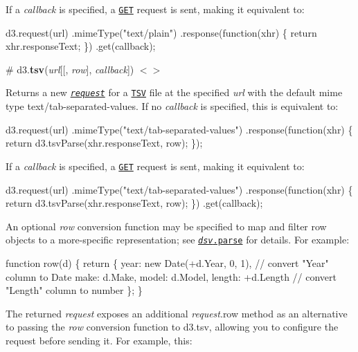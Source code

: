 If a {\itshape callback} is specified, a \href{#request_get}{\tt G\+ET} request is sent, making it equivalent to\+:


\begin{DoxyCode}
d3.request(url)
    .mimeType("text/plain")
    .response(function(xhr) \{ return xhr.responseText; \})
    .get(callback);
\end{DoxyCode}


\label{_tsv}%
\# d3.{\bfseries tsv}({\itshape url}\mbox{[}\mbox{[}, {\itshape row}\mbox{]}, {\itshape callback}\mbox{]}) \href{https://github.com/d3/d3-request/blob/master/src/tsv.js}{\tt $<$$>$}

Returns a new \href{#request}{\tt {\itshape request}} for a \href{https://github.com/d3/d3-dsv#tsvParse}{\tt T\+SV} file at the specified {\itshape url} with the default mime type {\ttfamily text/tab-\/separated-\/values}. If no {\itshape callback} is specified, this is equivalent to\+:


\begin{DoxyCode}
d3.request(url)
    .mimeType("text/tab-separated-values")
    .response(function(xhr) \{ return d3.tsvParse(xhr.responseText, row); \});
\end{DoxyCode}


If a {\itshape callback} is specified, a \href{#request_get}{\tt G\+ET} request is sent, making it equivalent to\+:


\begin{DoxyCode}
d3.request(url)
    .mimeType("text/tab-separated-values")
    .response(function(xhr) \{ return d3.tsvParse(xhr.responseText, row); \})
    .get(callback);
\end{DoxyCode}


An optional {\itshape row} conversion function may be specified to map and filter row objects to a more-\/specific representation; see \href{https://github.com/d3/d3-dsv#dsv_parse}{\tt {\itshape dsv}.parse} for details. For example\+:


\begin{DoxyCode}
function row(d) \{
  return \{
    year: new Date(+d.Year, 0, 1), // convert "Year" column to Date
    make: d.Make,
    model: d.Model,
    length: +d.Length // convert "Length" column to number
  \};
\}
\end{DoxyCode}


The returned {\itshape request} exposes an additional {\itshape request}.row method as an alternative to passing the {\itshape row} conversion function to d3.\+tsv, allowing you to configure the request before sending it. For example, this\+:



